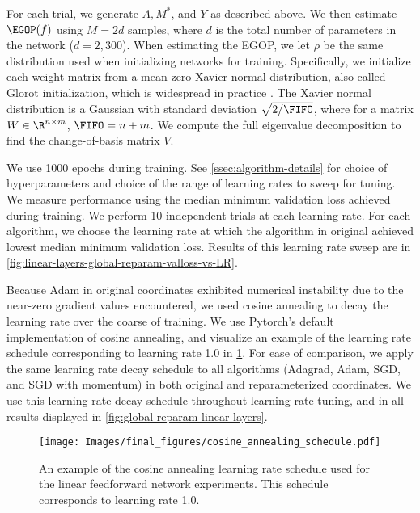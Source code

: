 For each trial, we generate $A, M^*$, and $Y$ as described above. We then estimate $\EGOP(f)$ using $M = 2d$ samples, where $d$ is the total number of parameters in the network ($d=2,300$). When estimating the EGOP, we let $\rho$ be the same distribution used when initializing networks for training. Specifically, we initialize each weight matrix from a mean-zero Xavier normal distribution, also called Glorot initialization, which is widespread in practice \cite{glorot2010understanding}. The Xavier normal distribution is a Gaussian with standard deviation $\sqrt{2/\FIFO}$, where for a matrix $W \in \R^{n\times m}$, $\FIFO = n+m$. We compute the full eigenvalue decomposition to find the change-of-basis matrix $V$.

We use 1000 epochs during training. See \cref{ssec:algorithm-details} for choice of  hyperparameters and choice of the range of learning rates to sweep for tuning. We measure performance using the median minimum validation loss achieved during training. We perform 10 independent trials at each learning rate. For each algorithm, we choose the learning rate at which the algorithm in original achieved lowest median minimum validation loss. Results of this learning rate sweep are in \cref{fig:linear-layers-global-reparam-valloss-vs-LR}.

Because Adam in original coordinates exhibited numerical instability due to the near-zero gradient values encountered, we used cosine annealing to decay the learning rate over the coarse of training. We use Pytorch's default implementation of cosine annealing, and visualize an example of the learning rate schedule corresponding to learning rate 1.0 in \cref{fig:cosine-annealing}. For ease of comparison, we apply the same learning rate decay schedule to all algorithms (Adagrad, Adam, SGD, and SGD with momentum) in both original and reparameterized coordinates. We use this learning rate decay schedule throughout learning rate tuning, and in all results displayed in \cref{fig:global-reparam-linear-layers}.

\begin{figure}[]
    \centering    \texttt{[image: Images/final\_figures/cosine\_annealing\_schedule.pdf]}
    \caption{An example of the cosine annealing learning rate schedule used for the linear feedforward network experiments. This schedule corresponds to learning rate 1.0.}
    \label{fig:cosine-annealing}
\end{figure}


